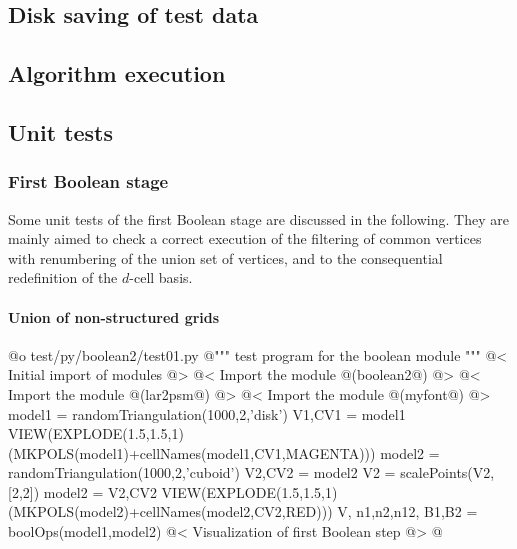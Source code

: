 \documentclass[11pt,oneside]{article}	%
\begin{document}
\subsection{Disk saving of test data}
\subsection{Algorithm execution}
\subsection{Unit tests}

\subsubsection{First Boolean stage}

Some unit tests of the first Boolean stage are discussed in the following. They are mainly aimed to check a correct execution of the filtering of common vertices with renumbering of the union set of vertices, and to the consequential redefinition of the $d$-cell basis.

\paragraph{Union of non-structured grids}

@o test/py/boolean2/test01.py
@{""" test program for the boolean module """
@< Initial import of modules @>
@< Import the module @(boolean2@) @>
@< Import the module @(lar2psm@) @>
@< Import the module @(myfont@) @>
model1 = randomTriangulation(1000,2,'disk')
V1,CV1 = model1
VIEW(EXPLODE(1.5,1.5,1)(MKPOLS(model1)+cellNames(model1,CV1,MAGENTA)))
model2 = randomTriangulation(1000,2,'cuboid')
V2,CV2 = model2
V2 = scalePoints(V2, [2,2])
model2 = V2,CV2 
VIEW(EXPLODE(1.5,1.5,1)(MKPOLS(model2)+cellNames(model2,CV2,RED)))
V, n1,n2,n12, B1,B2 = boolOps(model1,model2)
@< Visualization of first Boolean step @>
@}
\end{document}
